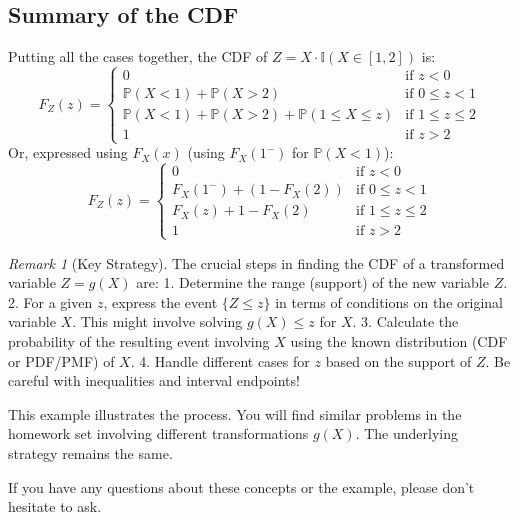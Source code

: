 \documentclass[11pt]{article}
\theoremstyle{definition}
\theoremstyle{remark}
\newtheorem{remark}[theorem]{Remark}
\newcommand{\Prob}{\mathbb{P}}
\begin{document}
\subsection{Summary of the CDF}

Putting all the cases together, the CDF of $Z = X \cdot \mathbb{I}(X \in [1, 2])$ is:
\[ F_Z(z) = \begin{cases} 0 & \text{if } z < 0 \\ \Prob(X < 1) + \Prob(X > 2) & \text{if } 0 \leq z < 1 \\ \Prob(X < 1) + \Prob(X > 2) + \Prob(1 \leq X \leq z) & \text{if } 1 \leq z \leq 2 \\ 1 & \text{if } z > 2 \end{cases} \]
Or, expressed using $F_X(x)$ (using $F_X(1^-)$ for $\Prob(X<1)$):
\[ F_Z(z) = \begin{cases} 0 & \text{if } z < 0 \\ F_X(1^-) + (1 - F_X(2)) & \text{if } 0 \leq z < 1 \\ F_X(z) + 1 - F_X(2) & \text{if } 1 \leq z \leq 2 \\ 1 & \text{if } z > 2 \end{cases} \]

\begin{remark}[Key Strategy]
The crucial steps in finding the CDF of a transformed variable $Z = g(X)$ are:
1.  Determine the range (support) of the new variable $Z$.
2.  For a given $z$, express the event $\{Z \leq z\}$ in terms of conditions on the original variable $X$. This might involve solving $g(X) \leq z$ for $X$.
3.  Calculate the probability of the resulting event involving $X$ using the known distribution (CDF or PDF/PMF) of $X$.
4.  Handle different cases for $z$ based on the support of $Z$.
Be careful with inequalities and interval endpoints!
\end{remark}

This example illustrates the process. You will find similar problems in the homework set involving different transformations $g(X)$. The underlying strategy remains the same.

\bigskip
If you have any questions about these concepts or the example, please don't hesitate to ask.
\end{document}

